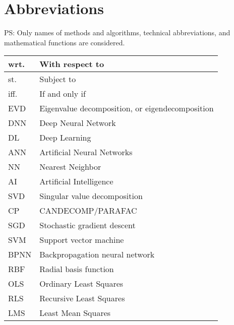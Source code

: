 \section{Abbreviations}
PS: Only names of methods and algorithms, technical abbreviations, and mathematical functions are considered.

\begin{xltabular}{\textwidth}{XX}
	wrt. & With respect to                                                                      \\ \hline
	st.  & Subject to                                                                           \\ \hline
	iff. & If and only if                                                                       \\ \hline
	EVD  & Eigenvalue decomposition, or eigendecomposition \cite{nossekAdaptiveArraySignal2015} \\ \hline
	DNN  & Deep Neural Network                                                                  \\ \hline
	DL   & Deep Learning                                                                        \\ \hline
	ANN  & Artificial Neural Networks \cite{goodfellowDeepLearning2016}                         \\ \hline
	NN   & Nearest Neighbor                                                                     \\ \hline
	AI   & Artificial Intelligence                                                              \\ \hline
	SVD  & Singular value decomposition                                                         \\ \hline
	CP   & CANDECOMP/PARAFAC                                                                    \\ \hline
	SGD  & Stochastic gradient descent                                                          \\ \hline
	SVM  & Support vector machine                                                               \\ \hline
	BPNN & Backpropagation neural network \cite{jiaoAutomaticEquatorialGPS2017}                 \\ \hline
	RBF  & Radial basis function                                                                \\ \hline
	OLS  & Ordinary Least Squares                                                               \\ \hline
	RLS  & Recursive Least Squares                                                              \\ \hline
	LMS  & Least Mean Squares                                                                   \\ \hline
\end{xltabular}